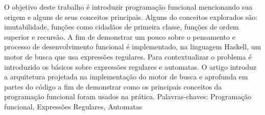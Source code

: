 O objetivo deste trabalho é introduzir programação funcional mencionando sua origem e alguns de seus conceitos principais.
Alguns do conceitos explorados são: imutabilidade, funções como cidadãos de primeira classe, funções de ordem superior e recursão.
A fim de demonstrar um pouco sobre o pensamento e processo de desenvolvimento funcional é implementado, na linguagem Haskell, um motor de busca que usa expressões regulares.
Para contextualizar o problema é introduzido os básicos sobre expressões regulares e automatas.
O artigo introduz a arquitetura projetada na implementação do motor de busca e aprofunda em partes do código a fim de demonstrar como os principais conceitos da programação funcional foram usados na prática.
Palavras-chaves: Programação funcional, Expressões Regulares, Automatas
